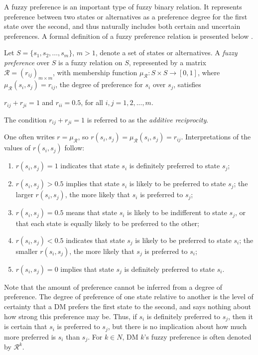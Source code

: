 A fuzzy preference is an important type of fuzzy binary relation. It represents preference between two states or alternatives as a preference degree for the first state over the second, and thus naturally includes both certain and uncertain preferences. A formal definition of a fuzzy preference relation is presented below \citep{Tanino1984, Tanino1988, Chiclana-et-al2001, Xu2007}.

\begin{definition}\label{def-fp}
\rm Let $S = \{s_1, s_2, \ldots, s_m\}$, $m>1$, denote a set of states or alternatives. A \emph{fuzzy preference} over $S$ is a fuzzy relation on $S$, represented by a matrix $\mathcal{R} =(r_{ij})_{m\times m}$, with membership function $\mu_{\mathcal{R}} : S \times S \longrightarrow [0, 1]$, where $\mu_{\mathcal{R}}(s_i, s_j)=r_{ij}$, the degree of preference for $s_i$ over $s_j$, satisfies
\begin{center}
$r_{ij} + r_{ji} = 1$ and $r_{ii} = 0.5$, for all $i,j=1,2, ..., m$.
\end{center}
\end{definition}
\noindent The condition $r_{ij} + r_{ji} = 1$ is referred to as the \emph{additive reciprocity}.

One often writes $r = \mu_{\mathcal{R}}$, so $r(s_i, s_j) = \mu_{\mathcal{R}}(s_i, s_j) = r_{ij}$. Interpretations of the values of $r(s_i, s_j)$ follow:

\begin{enumerate}[(1)]
\item $r(s_i, s_j) = 1$ indicates that state $s_i$ is definitely preferred to state $s_j$;
\item $r(s_i, s_j) > 0.5$ implies that state $s_i$ is likely to be preferred to state $s_j$; the larger $r(s_i, s_j)$, the more likely that $s_i$ is preferred to $s_j$;
\item $ r(s_i, s_j)=0.5 $ means that state $s_i$ is likely to be indifferent to state $s_j$, or that each state is equally likely to be preferred to the other;
\item $r(s_i, s_j) < 0.5$ indicates that state $s_j$ is likely to be preferred to state $s_i$; the smaller $r(s_i, s_j)$, the more likely that $s_j$ is preferred to $s_i$;
\item $r(s_i, s_j) = 0$ implies that state $s_j$ is definitely preferred to state $s_i$.
\end{enumerate}

Note that the amount of preference cannot be inferred from a degree of preference. The degree of preference of one state relative to another is the level of certainty that a DM prefers the first state to the second, and says nothing about how strong this preference may be. Thus, if $s_i$ is definitely preferred to $s_j$, then it is certain that $s_i$ is preferred to $s_j$, but there is no implication about how much more preferred is $s_i$ than $s_j$. For $k \in N$, DM $k$'s fuzzy preference is often denoted by $\mathcal{R}^k$.

